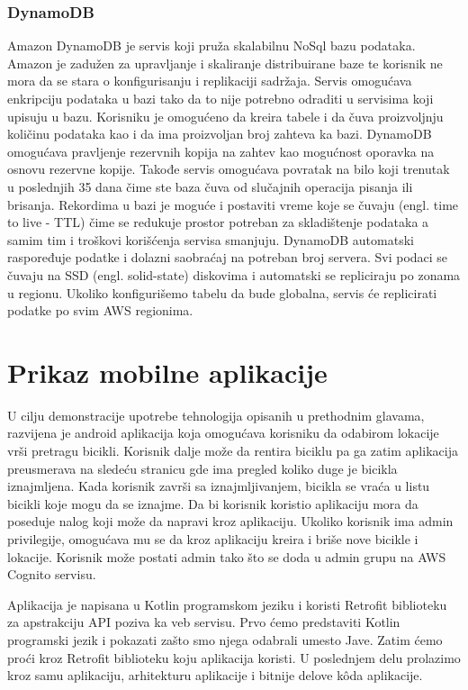 \documentclass[12pt,oneside]{memoir}
\begin{document}
\subsection{DynamoDB}

Amazon DynamoDB je servis koji pruža skalabilnu NoSql bazu podataka. Amazon je zadužen za upravljanje i skaliranje distribuirane baze te korisnik ne mora da se stara o konfigurisanju i replikaciji sadržaja. Servis omogućava enkripciju podataka u bazi tako da to nije potrebno odraditi u servisima koji upisuju u bazu. Korisniku je omogućeno da kreira tabele i da čuva proizvoljnju količinu podataka kao i da ima proizvoljan broj zahteva ka bazi. DynamoDB omogućava pravljenje rezervnih kopija na zahtev kao mogućnost oporavka na osnovu rezervne kopije. Takođe servis omogućava povratak na bilo koji trenutak u poslednjih 35 dana čime ste baza čuva od slučajnih operacija pisanja ili brisanja. Rekordima u bazi je moguće i postaviti vreme koje se čuvaju (engl. time to live - TTL) čime se redukuje prostor potreban za skladištenje podataka a samim tim i troškovi korišćenja servisa smanjuju. DynamoDB automatski raspoređuje podatke i dolazni saobraćaj na potreban broj servera. Svi podaci se čuvaju na SSD (engl. solid-state) diskovima i automatski se repliciraju po zonama u regionu. Ukoliko konfigurišemo tabelu da bude globalna, servis će replicirati podatke po svim AWS regionima.

\chapter{Prikaz mobilne aplikacije}
 
U cilju demonstracije upotrebe tehnologija opisanih u prethodnim glavama, razvijena je android aplikacija koja omogućava korisniku da odabirom lokacije vrši pretragu bicikli. Korisnik dalje može da rentira biciklu pa ga zatim aplikacija preusmerava na sledeću stranicu gde ima pregled koliko duge je bicikla iznajmljena. Kada korisnik završi sa iznajmljivanjem, bicikla se vraća u listu bicikli koje mogu da se iznajme. Da bi korisnik koristio aplikaciju mora da poseduje nalog koji može da napravi kroz aplikaciju. Ukoliko korisnik ima admin privilegije, omogućava mu se da kroz aplikaciju kreira i briše nove bicikle i lokacije. Korisnik može postati admin tako što se doda u admin grupu na AWS Cognito servisu.
 
Aplikacija je napisana u Kotlin programskom jeziku i koristi Retrofit biblioteku za apstrakciju API poziva ka veb servisu. Prvo ćemo predstaviti Kotlin programski jezik i pokazati zašto smo njega odabrali umesto Jave. Zatim ćemo proći kroz Retrofit biblioteku koju aplikacija koristi. U poslednjem delu prolazimo kroz samu aplikaciju, arhitekturu aplikacije i bitnije delove kôda aplikacije.
\end{document}
